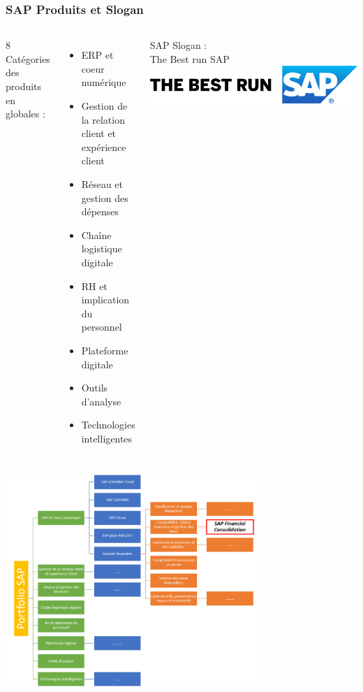 \documentclass{beamer}
\begin{document}
        \begin{frame}
            \frametitle{SAP Produits et Slogan}
            \begin{columns}
                    8 Catégories des produits en globales : 
                    \begin{itemize}
                        \item ERP et coeur numérique
                        \item Gestion de la relation client et expérience client
                        \item Réseau et gestion des dépenses
                        \item Chaîne logistique digitale
                        \item RH et implication du personnel
                        \item Plateforme digitale
                        \item Outils d’analyse
                        \item Technologies intelligentes
                    \end{itemize}
            SAP Slogan : \\ The Best run SAP
            \flushleft
            \includegraphics[width=\textwidth]{SAP_Best_R_grad_blk.jpg}
            \end{columns}
        \end{frame}
        
        \begin{frame}
            \includegraphics[height=8cm]{SAP_portfolio.png}
        \end{frame}
        
\end{document}
